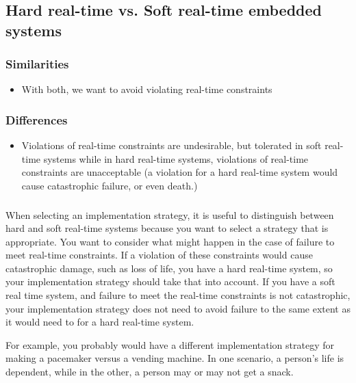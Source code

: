 \subsection*{Hard real-time vs. Soft real-time embedded systems}

\subsubsection*{Similarities}
\begin{itemize}
  \item With both, we want to avoid violating real-time constraints
\end{itemize}

\subsubsection*{Differences}
\begin{itemize}
  \item Violations of real-time constraints are undesirable, but tolerated in
    soft real-time systems while in hard real-time systems, violations of
    real-time constraints are unacceptable (a violation for a hard real-time
    system would cause catastrophic failure, or even death.)
\end{itemize}


\subsubsection*{}
When selecting an implementation strategy, it is useful to distinguish between
hard and soft real-time systems because you want to select a strategy that is
appropriate. You want to consider what might happen in the case of failure to 
meet real-time constraints. If a violation of these constraints would cause
catastrophic damage, such as loss of life, you have a hard real-time system,
so your implementation strategy should take that into account. If you have a
soft real time system, and failure to meet the real-time constraints is not
catastrophic, your implementation strategy does not need to avoid
failure to the same extent as it would need to for a hard real-time system.

For example, you probably would have a different implementation strategy for
making a pacemaker versus a vending machine. In one scenario, a person's life is
dependent, while in the other, a person may or may not get a snack.
